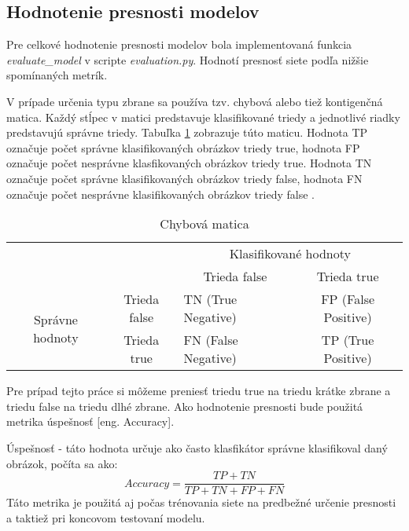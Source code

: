 \subsection{Hodnotenie presnosti modelov}
\label{subsec:hodnoteniepresnosti}
Pre celkové hodnotenie presnosti modelov bola implementovaná funkcia \textit{evaluate\_model} v scripte \textit{evaluation.py}.
Hodnotí presnosť siete podľa nižšie spomínaných metrík.

V prípade určenia typu zbrane sa používa tzv. chybová alebo tiež kontigenčná matica.
Každý stĺpec v matici predstavuje klasifikované triedy a jednotlivé riadky predstavujú správne triedy.
Tabuľka \ref{tab:chybovamatica} zobrazuje túto maticu.
Hodnota TP označuje počet správne klasifikovaných obrázkov triedy true, hodnota FP označuje počet nesprávne klasfikovaných obrázkov triedy true.
Hodnota TN označuje počet správne klasifikovaných obrázkov triedy false, hodnota FN označuje počet nesprávne klasifikovaných obrázkov triedy false \cite{odkaz:ChybovaMatica}.
\begin{table}[H]
    \centering
    \label{tab:chybovamatica}
        \begin{tabular}{lllc}
                                                                &                                   & \multicolumn{2}{c}{Klasifikované hodnoty}                                           \\ \cline{3-4} 
                                                                & \multicolumn{1}{l|}{}             & \multicolumn{1}{c|}{Trieda false}        & \multicolumn{1}{c|}{Trieda true}         \\ \cline{2-4} 
        \multicolumn{1}{c|}{\multirow{2}{*}{Správne hodnoty}} & \multicolumn{1}{c|}{Trieda false} & \multicolumn{1}{l|}{TN (True Negative)}  & \multicolumn{1}{c|}{FP (False Positive)} \\ \cline{2-4} 
        \multicolumn{1}{c|}{}                                 & \multicolumn{1}{c|}{Trieda true}  & \multicolumn{1}{l|}{FN (False Negative)} & \multicolumn{1}{c|}{TP (True Positive)}  \\ \cline{2-4} 
    \end{tabular}
    \caption{Chybová matica}
\end{table}
Pre prípad tejto práce si môžeme preniesť triedu true na triedu krátke zbrane a triedu false na triedu dlhé zbrane.
Ako hodnotenie presnosti bude použitá metrika úspešnosť [eng. Accuracy].

Úspešnosť - táto hodnota určuje ako často klasfikátor správne klasifikoval daný obrázok, počíta sa ako:
\begin{equation}
    Accuracy = \frac{TP + TN}{TP + TN + FP + FN}
\end{equation}
Táto metrika je použitá aj počas trénovania siete na predbežné určenie presnosti a taktiež pri koncovom testovaní modelu.

